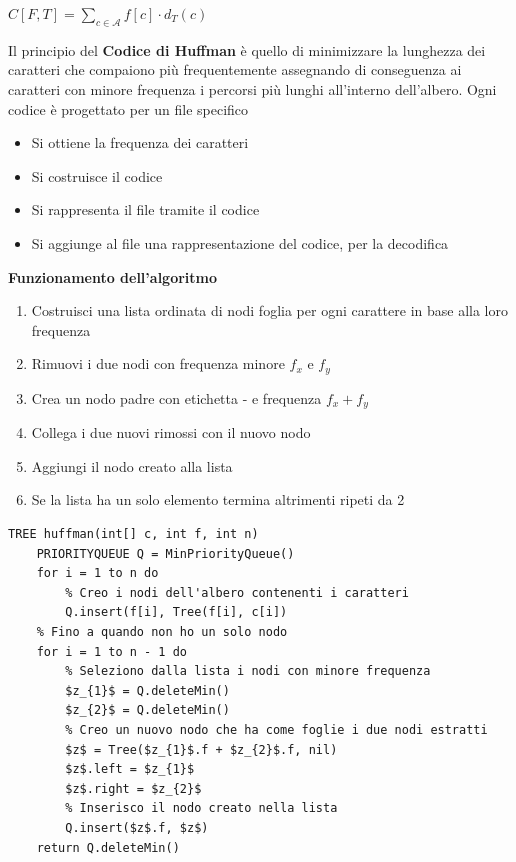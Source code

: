 \documentclass[../cheatSheetAlgoritmi.tex]{subfiles}
\begin{document}
\begin{center}
	$C[F, T] = \sum_{c \in \mathcal{A}} f[c] \cdot d_{T}(c)$
\end{center}
Il principio del \textbf{Codice di Huffman} è quello di minimizzare la lunghezza dei caratteri che compaiono più frequentemente assegnando di conseguenza ai caratteri con minore frequenza i percorsi più lunghi all'interno dell'albero. Ogni codice è progettato per un file specifico
\begin{itemize}
	\item Si ottiene la frequenza dei caratteri
	\item Si costruisce il codice
	\item Si rappresenta il file tramite il codice
	\item Si aggiunge al file una rappresentazione del codice, per la decodifica
\end{itemize}
\textbf{Funzionamento dell'algoritmo}
\begin{enumerate}
	\item Costruisci una lista ordinata di nodi foglia per ogni carattere in base alla loro frequenza
	\item Rimuovi i due nodi con frequenza minore $f_{x}$ e $f_{y}$
	\item Crea un nodo padre con etichetta - e frequenza $f_{x} + f_{y}$
	\item Collega i due nuovi rimossi con il nuovo nodo
	\item Aggiungi il nodo creato alla lista 
	\item Se la lista ha un solo elemento termina altrimenti ripeti da 2
\end{enumerate}
\begin{lstlisting}[caption=creazione albero binario di decodifica]
TREE huffman(int[] c, int f, int n)
	PRIORITYQUEUE Q = MinPriorityQueue()
	for i = 1 to n do
		% Creo i nodi dell'albero contenenti i caratteri
		Q.insert(f[i], Tree(f[i], c[i])
	% Fino a quando non ho un solo nodo
	for i = 1 to n - 1 do
		% Seleziono dalla lista i nodi con minore frequenza
		$z_{1}$ = Q.deleteMin()
		$z_{2}$ = Q.deleteMin()
		% Creo un nuovo nodo che ha come foglie i due nodi estratti
		$z$ = Tree($z_{1}$.f + $z_{2}$.f, nil)
		$z$.left = $z_{1}$
		$z$.right = $z_{2}$
		% Inserisco il nodo creato nella lista
		Q.insert($z$.f, $z$)
	return Q.deleteMin()
\end{lstlisting}
\end{document}
